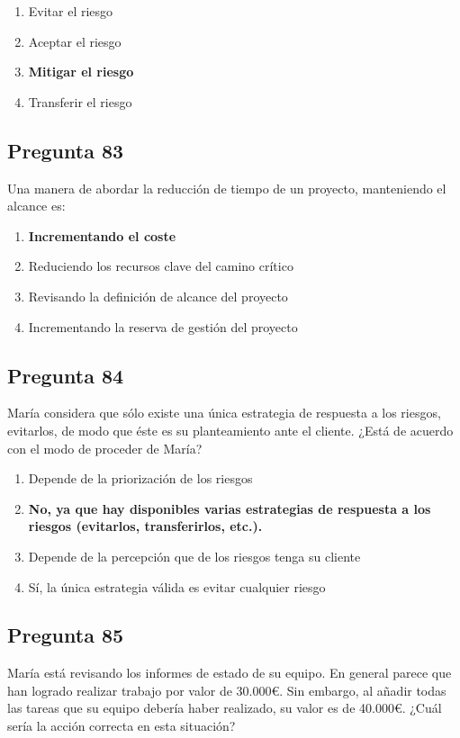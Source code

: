 \documentclass[11pt,a4paper]{article}
\begin{document}
\begin{enumerate}[label=\alph*)]
  \item Evitar el riesgo
  \item Aceptar el riesgo
  \item \textbf{Mitigar el riesgo}
  \item Transferir el riesgo
\end{enumerate}

\subsection*{Pregunta 83}
Una manera de abordar la reducción de tiempo de un proyecto, manteniendo el alcance es:

\begin{enumerate}[label=\alph*)]
  \item \textbf{Incrementando el coste}
  \item Reduciendo los recursos clave del camino crítico
  \item Revisando la definición de alcance del proyecto
  \item Incrementando la reserva de gestión del proyecto
\end{enumerate}

\subsection*{Pregunta 84}
María considera que sólo existe una única estrategia de respuesta a los riesgos, evitarlos, de modo que éste es su planteamiento ante el cliente. ¿Está de acuerdo con el modo de proceder de María?

\begin{enumerate}[label=\alph*)]
  \item Depende de la priorización de los riesgos
  \item \textbf{No, ya que hay disponibles varias estrategias de respuesta a los riesgos (evitarlos, transferirlos, etc.).}
  \item Depende de la percepción que de los riesgos tenga su cliente
  \item Sí, la única estrategia válida es evitar cualquier riesgo
\end{enumerate}

\subsection*{Pregunta 85}
María está revisando los informes de estado de su equipo. En general parece que han logrado realizar trabajo por valor de 30.000€. Sin embargo, al añadir todas las tareas que su equipo debería haber realizado, su valor es de 40.000€. ¿Cuál sería la acción correcta en esta situación?
\end{document}
